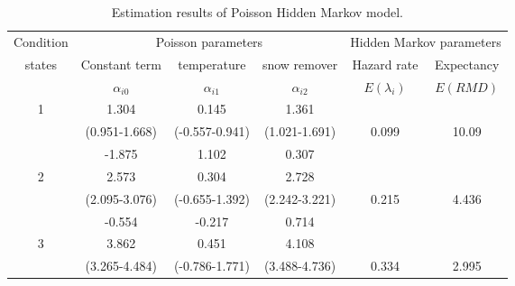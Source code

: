 \documentclass[a4paper,oneside,onecolumn,preprint,10pt,authoryear]{elsarticle}
\begin{document}
\begin{table}%
\caption{Estimation results of Poisson Hidden Markov model.}
\label{table2}
\begin{center}
{\small 
\begin{tabular}{l|l|l|l|l|l}
\hline
\multicolumn{1}{c|}{Condition} & \multicolumn{3}{c|}{Poisson parameters} & \multicolumn{2}{c}{Hidden Markov parameters} \\ 
\cline{2-6}
\multicolumn{1}{c|}{states} & \multicolumn{1}{c|}{Constant term} & \multicolumn{1}{c|}{temperature}& \multicolumn{1}{c|}{snow remover} &  \multicolumn{1}{c|}{Hazard rate}& \multicolumn{1}{c}{Expectancy}\\ 
\multicolumn{1}{c|}{} & \multicolumn{1}{c|}{$\alpha_{i0}$} & \multicolumn{1}{c|}{$\alpha_{i1}$}& \multicolumn{1}{c|}{$\alpha_{i2}$} &  \multicolumn{1}{c|}{$E(\lambda_i)$}& \multicolumn{1}{c}{$E(RMD)$}\\ 
\hline
\multicolumn{1}{c|}{1} & \multicolumn{1}{c|}{1.304} & \multicolumn{1}{c|}{0.145}& \multicolumn{1}{c|}{1.361} &  \multicolumn{1}{c|}{}& \multicolumn{1}{c}{}\\ 
\multicolumn{1}{c|}{} & \multicolumn{1}{c|}{(0.951-1.668)}  & \multicolumn{1}{c|}{(-0.557-0.941)}& \multicolumn{1}{c|}{(1.021-1.691)}&  \multicolumn{1}{c|}{0.099}& \multicolumn{1}{c}{10.09}\\ 
\multicolumn{1}{c|}{} & \multicolumn{1}{c|}{-1.875}  & \multicolumn{1}{c|}{1.102}&  \multicolumn{1}{c|}{0.307}&  \multicolumn{1}{c|}{}& \multicolumn{1}{c}{}\\ 
\hline
\multicolumn{1}{c|}{2} & \multicolumn{1}{c|}{2.573} & \multicolumn{1}{c|}{0.304}& \multicolumn{1}{c|}{2.728}&  \multicolumn{1}{c|}{}& \multicolumn{1}{c}{}\\ 
\multicolumn{1}{c|}{} & \multicolumn{1}{c|}{(2.095-3.076)} & \multicolumn{1}{c|}{(-0.655-1.392)}& \multicolumn{1}{c|}{(2.242-3.221)}&  \multicolumn{1}{c|}{0.215}& \multicolumn{1}{c}{4.436}\\ 
\multicolumn{1}{c|}{} & \multicolumn{1}{c|}{-0.554}  & \multicolumn{1}{c|}{-0.217}& \multicolumn{1}{c|}{0.714}&  \multicolumn{1}{c|}{}& \multicolumn{1}{c}{}\\ 
\hline
\multicolumn{1}{c|}{3} & \multicolumn{1}{c|}{3.862}  & \multicolumn{1}{c|}{0.451}& \multicolumn{1}{c|}{4.108}&  \multicolumn{1}{c|}{}& \multicolumn{1}{c}{}\\ 
\multicolumn{1}{c|}{} & \multicolumn{1}{c|}{(3.265-4.484)}  & \multicolumn{1}{c|}{(-0.786-1.771)}& \multicolumn{1}{c|}{(3.488-4.736)}&  \multicolumn{1}{c|}{0.334}& \multicolumn{1}{c}{2.995}\\ 

\end{tabular}}
\end{center}
\end{table}
\end{document}

